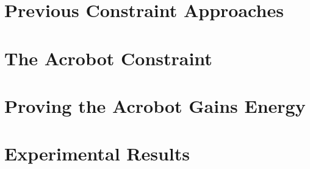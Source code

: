 \section{Previous Constraint Approaches}

\section{The Acrobot Constraint}
\section{Proving the Acrobot Gains Energy}

\section{Experimental Results}

